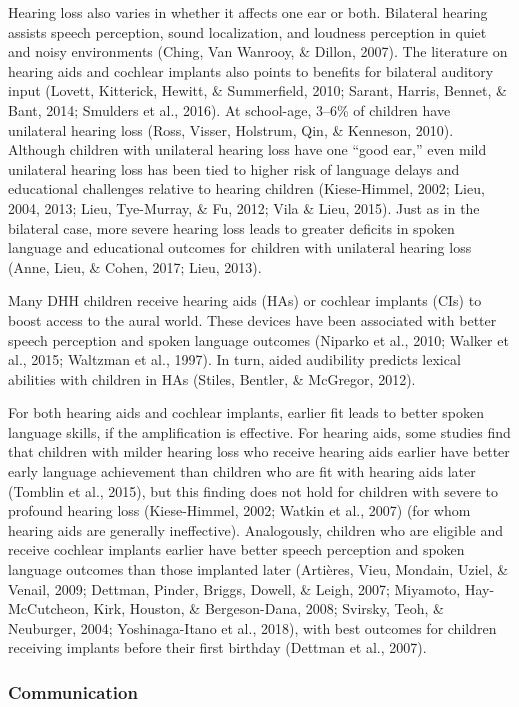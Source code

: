 \documentclass[english,man]{apa6}
\begin{document}
Hearing loss also varies in whether it affects one ear or both. Bilateral hearing assists speech perception, sound localization, and loudness perception in quiet and noisy environments (Ching, Van Wanrooy, \& Dillon, 2007). The literature on hearing aids and cochlear implants also points to benefits for bilateral auditory input (Lovett, Kitterick, Hewitt, \& Summerfield, 2010; Sarant, Harris, Bennet, \& Bant, 2014; Smulders et al., 2016). At school-age, 3--6\% of children have unilateral hearing loss (Ross, Visser, Holstrum, Qin, \& Kenneson, 2010). Although children with unilateral hearing loss have one \enquote{good ear,} even mild unilateral hearing loss has been tied to higher risk of language delays and educational challenges relative to hearing children (Kiese-Himmel, 2002; Lieu, 2004, 2013; Lieu, Tye-Murray, \& Fu, 2012; Vila \& Lieu, 2015). Just as in the bilateral case, more severe hearing loss leads to greater deficits in spoken language and educational outcomes for children with unilateral hearing loss (Anne, Lieu, \& Cohen, 2017; Lieu, 2013).

Many DHH children receive hearing aids (HAs) or cochlear implants (CIs) to boost access to the aural world. These devices have been associated with better speech perception and spoken language outcomes (Niparko et al., 2010; Walker et al., 2015; Waltzman et al., 1997). In turn, aided audibility predicts lexical abilities with children in HAs (Stiles, Bentler, \& McGregor, 2012).

For both hearing aids and cochlear implants, earlier fit leads to better spoken language skills, if the amplification is effective. For hearing aids, some studies find that children with milder hearing loss who receive hearing aids earlier have better early language achievement than children who are fit with hearing aids later (Tomblin et al., 2015), but this finding does not hold for children with severe to profound hearing loss (Kiese-Himmel, 2002; Watkin et al., 2007) (for whom hearing aids are generally ineffective). Analogously, children who are eligible and receive cochlear implants earlier have better speech perception and spoken language outcomes than those implanted later (Artières, Vieu, Mondain, Uziel, \& Venail, 2009; Dettman, Pinder, Briggs, Dowell, \& Leigh, 2007; Miyamoto, Hay-McCutcheon, Kirk, Houston, \& Bergeson-Dana, 2008; Svirsky, Teoh, \& Neuburger, 2004; Yoshinaga-Itano et al., 2018), with best outcomes for children receiving implants before their first birthday (Dettman et al., 2007).

\hypertarget{communication}{%
\subsubsection{Communication}\label{communication}}
\end{document}
